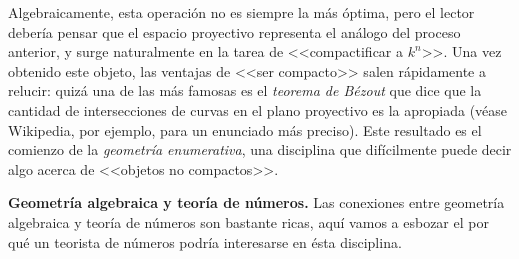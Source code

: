 \documentclass[11pt, reqno]{amsart}
\begin{document}
Algebraicamente, esta operación no es siempre la más óptima, pero el lector debería pensar que el espacio proyectivo representa el análogo del proceso anterior,
y surge naturalmente en la tarea de <<compactificar a $k^n$>>.
Una vez obtenido este objeto, las ventajas de <<ser compacto>> salen rápidamente a relucir: quizá una de las más famosas es el \textit{teorema de Bézout} que dice
que la cantidad de intersecciones de curvas en el plano proyectivo es la apropiada (véase Wikipedia, por ejemplo, para un enunciado más preciso).
Este resultado es el comienzo de la \textit{geometría enumerativa}, una disciplina que difícilmente puede decir algo acerca de <<objetos no compactos>>.

\textbf{Geometría algebraica y teoría de números.}
Las conexiones entre geometría algebraica y teoría de números son bastante ricas, aquí vamos a esbozar el por qué un teorista de números podría interesarse en ésta
disciplina.
\end{document}

